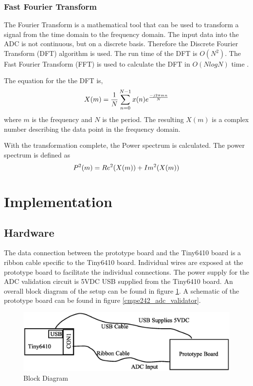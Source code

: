 \documentclass[10pt,conference]{IEEEtran}
\begin{document}
\subsubsection{Fast Fourier Transform}
The Fourier Transform is a mathematical tool that can be used to transform a signal from the time domain to the frequency domain. The input data into the ADC is not continuous, but on a discrete basis. Therefore the Discrete Fourier Transform (DFT) algorithm is used. The run time of the DFT is $O(N^2)$. The Fast Fourier Transform (FFT) is used to calculate the DFT in $O(NlogN)$ time \cite{FFTO}. 

The equation for the the DFT is,
\begin{equation}
	\large
	X(m) = \frac{1}{N} \sum_{n=0}^{N-1}x(n)e^{ \frac{-j2\pi{mn}}{N} }
\end{equation}
where $m$ is the frequency and $N$ is the period. The resulting $X(m)$ is a complex number describing the data point in the frequency domain.

With the transformation complete, the Power spectrum is calculated. The power spectrum is defined as
\begin{equation}
	\large
	P^2(m) = Re^2(X(m)) + Im^2(X(m))
\end{equation}

%
%
\section{Implementation}

\subsection{Hardware}
The data connection between the prototype board and the Tiny6410 board is a ribbon cable specific to the Tiny6410 board. Individual wires are exposed at the prototype board to facilitate the individual connections. The power supply for the ADC validation circuit is 5VDC USB supplied from the Tiny6410 board.  An overall block diagram of the setup can be found in figure \ref{BlockDiagram}. A schematic of the prototype board can be found in figure \ref{cmpe242_adc_validator}.

\begin{figure}[ht]
	\includegraphics[scale=.30]{BlockDiagram}
	\caption{Block Diagram}\label{BlockDiagram}
\end{figure}
\end{document}
